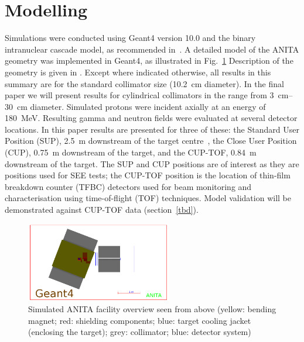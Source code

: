 \documentclass[11pt,a4paper]{IEEEtran}
\let\MYoriglatexcaption\caption
\renewcommand{\caption}[2][\relax]{\MYoriglatexcaption[#2]{#2}}
\begin{document}
\section{Modelling}
Simulations were conducted using Geant4 version 10.0 and the binary intranuclear cascade model, as recommended in~\cite{Platt13}.
A detailed model of the ANITA geometry was implemented in Geant4, as illustrated in Fig.~\ref{fig:ANITAoverview}
Description of the geometry is given in \cite{Prokofiev2009,Prokofiev14}.
Except where indicated otherwise, all results in this summary are for the standard collimator size (\SI{10.2}{\cm} diameter).
In the final paper we will present results for cylindrical collimators in the range from \SIrange{3}{30}{\cm} diameter.
Simulated protons were incident axially at an energy of \SI{180}{\MeV}.
Resulting gamma and neutron fields were evaluated at several detector locations.
In this paper results are presented for three of these: the Standard User Position (SUP), \SI{2.5}{\m} downstream of the target centre~\cite{Prokofiev2009}, the Close User Position (CUP), \SI{0.75}{\m} downstream of the target, and the CUP-TOF, \SI{0.84}{m} downstream of the target.
The SUP and CUP positions are of interest as they are positions used for SEE tests; the CUP-TOF position is the location of thin-film breakdown counter (TFBC) detectors used for beam monitoring and characterisation using time-of-flight (TOF) techniques.
Model validation will be demonstrated against CUP-TOF data (section~\ref{tbd}).

\begin{figure}[t]
	\centering
	\includegraphics[width=2.5in]{overview.png}
	\caption{
        Simulated ANITA facility overview seen from above (yellow: bending magnet; red: shielding components; blue: target cooling jacket (enclosing the target); grey: collimator; blue: detector system)
    }
	\label{fig:ANITAoverview}
\end{figure}
\end{document}
